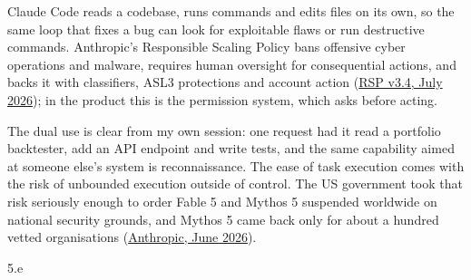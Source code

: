 \begin{answer}
  Claude Code reads a codebase, runs commands and edits files on its own, so the same loop that
  fixes a bug can look for exploitable flaws or run destructive commands. Anthropic's Responsible
  Scaling Policy bans offensive cyber operations and malware, requires human oversight for
  consequential actions, and backs it with classifiers, ASL3 protections and account action
  (\href{https://cdn.sanity.io/files/4zrzovbb/website/0bacdc8440ea96e62a8766d99ebe1d4eea6d5f3a.pdf}{RSP
  v3.4, July 2026}); in the product this is the permission system, which asks before acting.

  \medskip
  The dual use is clear from my own session: one request had it read a portfolio backtester, add an
  API endpoint and write tests, and the same capability aimed at someone else's system is
  reconnaissance. The ease of task execution comes with the risk of unbounded execution outside of
  control. The US government took that risk seriously enough to order Fable 5 and Mythos 5
  suspended worldwide on national security grounds, and Mythos 5 came back only for about a hundred
  vetted organisations
  (\href{https://www.anthropic.com/news/fable-mythos-access}{Anthropic, June 2026}).
\end{answer}

\LARGE
5.e
\normalsize

